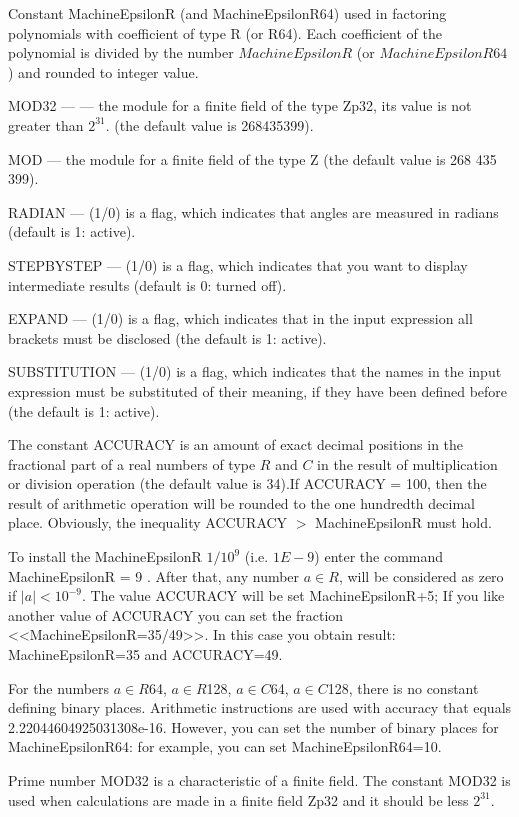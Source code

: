 Constant MachineEpsilonR (and MachineEpsilonR64) used in factoring polynomials 
with coefficient of type R (or R64). Each coefficient of the polynomial is divided by the number $ MachineEpsilonR $ 
(or $ MachineEpsilonR64 $) and rounded to integer value.

MOD32 --- --- the module for a finite field of the type Zp32, its value is not greater than $2^{31}$. 
(the default value is 268435399).

MOD --- the module for a finite field of the type Z (the default value is 268 435 399).

RADIAN --- (1/0) is a flag, which indicates that angles are measured in radians (default is 1:  active).

STEPBYSTEP --- (1/0) is a flag, which indicates that you want to display intermediate results (default is 0:  turned off).

EXPAND --- (1/0) is a flag, which indicates that in the input expression all brackets must be disclosed (the default is 1:   active).

SUBSTITUTION --- (1/0) is a flag, which indicates that the names in the input expression must be substituted of their meaning, if they have been defined before (the default is 1:  active).

The constant ACCURACY is an amount of exact decimal positions in the fractional part of a real numbers of type $R$ and $C$ in the result of multiplication or division operation (the default value is 34).If ACCURACY = 100, then the result of arithmetic operation will be rounded to the one hundredth decimal place.  Obviously, the inequality ACCURACY $>$ MachineEpsilonR must hold.

To install the MachineEpsilonR $ 1/10^9 $ (i.e. $1E-9$) enter the command   MachineEpsilonR = 9  .
After that, any number $ a \in R $, will be considered as zero if $ | a | <10^{-9}.$
The value ACCURACY will be set  MachineEpsilonR+5; If you like another value of ACCURACY you can
set the fraction <<MachineEpsilonR=35/49>>. In this case you obtain result: MachineEpsilonR=35 and ACCURACY=49.

For the numbers $ a \in R$64, $ a \in R$128, $ a \in C$64, $ a \in C$128,  there is no constant defining binary places. Arithmetic instructions are used with accuracy that equals 2.22044604925031308e-16.
  However, you can set the number of binary places for MachineEpsilonR64: for example, you can set MachineEpsilonR64=10.

Prime number MOD32 is a characteristic of a finite field.
The constant MOD32 is used when calculations are made in a finite field
Zp32 and it should be less $2^{31}$.


